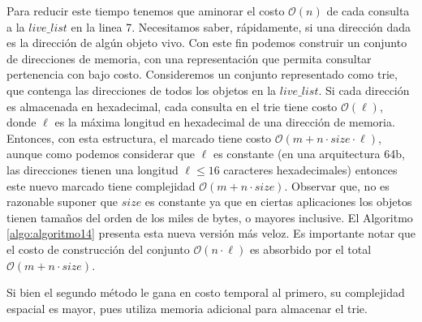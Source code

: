 Para reducir este tiempo tenemos que aminorar el costo $\mathcal{O}(n)$ de cada consulta a la $live\_list$ en la linea 7. Necesitamos saber, rápidamente, si una dirección dada es la dirección de algún objeto vivo. Con este fin podemos construir un conjunto de direcciones de memoria, con una representación que permita consultar pertenencia con bajo costo. Consideremos un conjunto representado como trie, que contenga las direcciones de todos los objetos en la $live\_list$. Si cada dirección es almacenada en hexadecimal, cada consulta en el trie tiene costo $\mathcal{O}(\ell)$, donde $\ell$ es la máxima longitud en hexadecimal de una dirección de memoria. Entonces, con esta estructura, el marcado tiene costo $\mathcal{O}(m + n \cdot size \cdot \ell)$, aunque como podemos considerar que $\ell$ es constante (en una arquitectura 64b, las direcciones tienen una longitud $\ell \leq 16$ caracteres hexadecimales) entonces este nuevo marcado tiene complejidad $\mathcal{O}(m + n \cdot size)$. Observar que, no es razonable suponer que $size$ es constante ya que en ciertas aplicaciones los objetos tienen tamaños del orden de los miles de bytes, o mayores inclusive. El Algoritmo \ref{algo:algoritmo14} presenta esta nueva versión más veloz. Es importante notar que el costo de construcción del conjunto  $\mathcal{O}(n \cdot \ell)$ es absorbido por el total $\mathcal{O}(m + n \cdot size)$.

Si bien el segundo método le gana en costo temporal al primero, su complejidad espacial es mayor, pues utiliza memoria adicional para almacenar el trie.

\begin{algorithm}
	\dontprintsemicolon
	\Input{-}
	\Output{-}
 	\BlankLine
\caption{$\textsc{Mark-Sweep}$}
\label{algo:algoritmo13}
\end{algorithm}

\begin{algorithm}
	\dontprintsemicolon
	\Output{-}
 	\BlankLine
\caption{$\textsc{Mark}$}
\label{algo:algoritmo14}
\end{algorithm}

